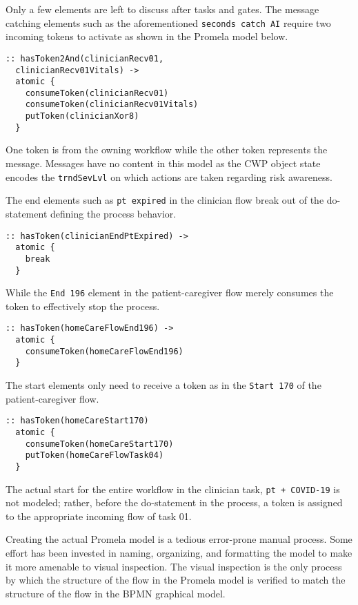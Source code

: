 Only a few elements are left to discuss after tasks and gates. The message catching elements such as the aforementioned \texttt{seconds catch AI} require two incoming tokens to activate as shown in the Promela model below.
%
{\small
\begin{lstlisting}[style=myPromela]
:: hasToken2And(clinicianRecv01, 
  clinicianRecv01Vitals) ->
  atomic {
    consumeToken(clinicianRecv01)
    consumeToken(clinicianRecv01Vitals)
    putToken(clinicianXor8)
  }
\end{lstlisting}
}
%
\noindent One token is from the owning workflow while the other token represents the message. Messages have no content in this model as the CWP object state encodes the \texttt{trndSevLvl} on which actions are taken regarding risk awareness.

The end elements such as \texttt{pt expired} in the clinician flow break out of the do-statement defining the process behavior.
%
{\small
\begin{lstlisting}[style=myPromela]
:: hasToken(clinicianEndPtExpired) ->
  atomic {
    break
  }
\end{lstlisting}
}
%
\noindent While the \texttt{End 196} element in the patient-caregiver flow merely consumes the token to effectively stop the process.
%
{\small
\begin{lstlisting}[style=myPromela]
:: hasToken(homeCareFlowEnd196) ->
  atomic {
    consumeToken(homeCareFlowEnd196)
  }
\end{lstlisting}
}
% 
\noindent The start elements only need to receive a token as in the \texttt{Start 170} of the patient-caregiver flow.
%
{\small
\begin{lstlisting}[style=myPromela]
:: hasToken(homeCareStart170)
  atomic {
    consumeToken(homeCareStart170)
    putToken(homeCareFlowTask04)
  }
\end{lstlisting}
}
% 
\noindent The actual start for the entire workflow in the clinician task, \texttt{pt + COVID-19} is not modeled; rather, before the do-statement in the process, a token is assigned to the appropriate incoming flow of task 01.

Creating the actual Promela model is a tedious error-prone manual process. Some effort has been invested in naming, organizing, and formatting the model to make it more amenable to visual inspection. The visual inspection is the only process by which the structure of the flow in the Promela model is verified to match the structure of the flow in the BPMN graphical model.